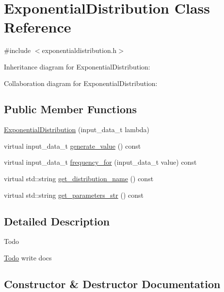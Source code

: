 \hypertarget{classExponentialDistribution}{}\section{Exponential\+Distribution Class Reference}
\label{classExponentialDistribution}


{\ttfamily \#include $<$exponentialdistribution.\+h$>$}



Inheritance diagram for Exponential\+Distribution\+:


Collaboration diagram for Exponential\+Distribution\+:
\subsection*{Public Member Functions}
\begin{DoxyCompactItemize}
\item 
\hyperlink{classExponentialDistribution_a3355ec9d5206c46a0478937f659aa802}{Exponential\+Distribution} (input\+\_\+data\+\_\+t lambda)
\item 
virtual input\+\_\+data\+\_\+t \hyperlink{classExponentialDistribution_a00e0abeff4f9e4cc64926de49d027711}{generate\+\_\+value} () const
\item 
virtual input\+\_\+data\+\_\+t \hyperlink{classExponentialDistribution_a1bf7a6f5d124a053934654af1e70f9bc}{frequency\+\_\+for} (input\+\_\+data\+\_\+t value) const
\item 
virtual std\+::string \hyperlink{classExponentialDistribution_a98ac6f2df798ae19bc371a2f071e21bb}{get\+\_\+distribution\+\_\+name} () const
\item 
virtual std\+::string \hyperlink{classExponentialDistribution_aa6f3a3208a0ec5f4b7f5fa8a36938c89}{get\+\_\+parameters\+\_\+str} () const
\end{DoxyCompactItemize}


\subsection{Detailed Description}
\begin{DoxyRefDesc}{Todo}
\item[\hyperlink{todo__todo000001}{Todo}]write docs \end{DoxyRefDesc}


\subsection{Constructor \& Destructor Documentation}
\mbox{\label{classExponentialDistribution_a3355ec9d5206c46a0478937f659aa802}} 
